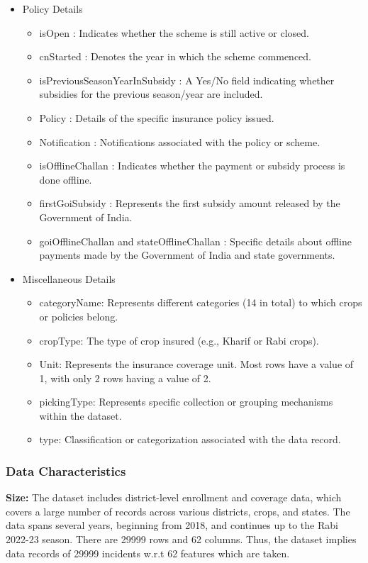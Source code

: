 \documentclass[12pt]{article}
\begin{document}
\begin{itemize}
\item {Policy Details}
\begin{itemize}
\item{isOpen : Indicates whether the scheme is still active or closed.}
\item{cnStarted : Denotes the year in which the scheme commenced.}
\item{isPreviousSeasonYearInSubsidy : A Yes/No field indicating whether subsidies for the previous season/year are included.}
\item{Policy : Details of the specific insurance policy issued.}
\item{Notification : Notifications associated with the policy or scheme.}
\item{isOfflineChallan : Indicates whether the payment or subsidy process is done offline.}
\item{firstGoiSubsidy : Represents the first subsidy amount released by the Government of India.}
\item{goiOfflineChallan and stateOfflineChallan : Specific details about offline payments made by the Government of India and state governments.}
\end{itemize}
\end{itemize}


\begin{itemize}
\item {Miscellaneous Details}
\begin{itemize}
\item{categoryName: Represents different categories (14 in total) to which crops or policies belong.}
\item{cropType: The type of crop insured (e.g., Kharif or Rabi crops).}
\item{Unit: Represents the insurance coverage unit. Most rows have a value of 1, with only 2 rows having a value of 2.}
\item{pickingType: Represents specific collection or grouping mechanisms within the dataset.}
\item{type: Classification or categorization associated with the data record.}
\end{itemize}
\end{itemize}

\subsubsection{Data Characteristics}
\vspace{5pt}
\textbf{Size:} The dataset includes district-level enrollment and coverage data, which covers a large number of records across various districts, crops, and states. 
The data spans several years, beginning from 2018, and continues up to the Rabi 2022-23 season. There are 29999 rows and 62 columns. Thus, the dataset implies data records of 29999 incidents w.r.t 62 features which are taken.
\vspace{5pt}
\end{document}
